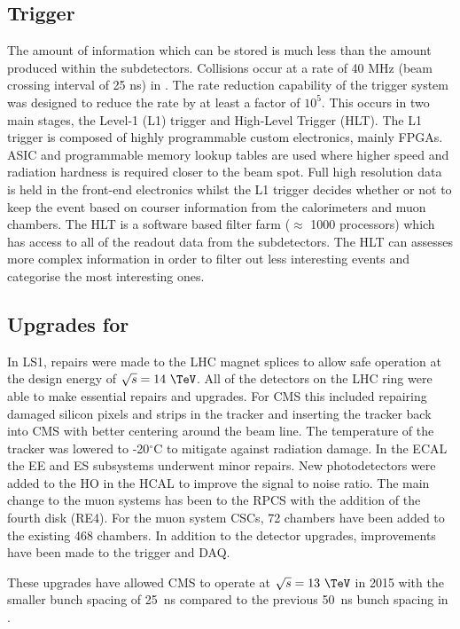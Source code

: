 \subsection{Trigger \label{det:trigger}}
%  
The amount of information which can be stored is much less than the amount produced within the subdetectors. Collisions occur at a rate of 40 MHz (beam crossing interval of 25 ns) in \runtwo. The rate reduction capability of the trigger system was designed to reduce the rate by at least a factor of $10^5$. This occurs in two main stages, the Level-1 (L1) trigger and High-Level Trigger (HLT). The L1 trigger is composed of highly programmable custom electronics, mainly FPGAs. ASIC and programmable memory lookup tables are used where higher speed and radiation hardness is required closer to the beam spot. Full high resolution data is held in the front-end electronics whilst the L1 trigger decides whether or not to keep the event based on courser information from the calorimeters and muon chambers. The HLT is a software based filter farm ($\approx$ 1000 processors) which has access to all of the readout data from the subdetectors. The HLT can assesses more complex information in order to filter out less interesting events and categorise the most interesting ones. 

\subsection{Upgrades for \runtwo}

In LS1, repairs were made to the LHC magnet splices to allow safe operation at the design energy of $\sqrt{s} = 14~\TeV$. All of the detectors on the LHC ring were able to make essential repairs and upgrades. For CMS this included repairing damaged silicon pixels and strips in the tracker and inserting the tracker back into CMS with better centering around the beam line. The temperature of the tracker was lowered to -20$^{\circ}$C to mitigate against radiation damage. In the ECAL the EE and ES subsystems underwent minor repairs. New photodetectors were added to the HO in the HCAL to improve the signal to noise ratio. The main change to the muon systems has been to the RPCS with the addition of the fourth disk (RE4). For the muon system CSCs, 72 chambers have been added to the existing 468 chambers. In addition to the detector upgrades, improvements have been made to the trigger and DAQ.

These upgrades have allowed CMS to operate at $\sqrt{s} = 13~\TeV$ in 2015 with the smaller bunch spacing of 25~ns compared to the previous 50~ns bunch spacing in \runone.

